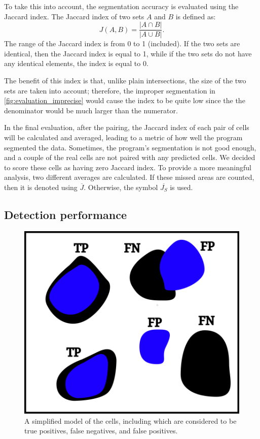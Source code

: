 \documentclass[
  digital,     %
  oneside,     %
  nosansbold,  %
  nocolorbold, %
  lof,         %
  lot,         %
]{fithesis4}
\begin{document}
To take this into account, the segmentation accuracy is evaluated using the
Jaccard index. The Jaccard index of two sets $A$ and $B$ is defined
as\cite{2020eelbode}:
$$J(A, B) = \frac{|A \cap B|}{|A \cup B|}.$$
The range of the Jaccard index is from 0 to 1 (included). If the two sets are
identical, then the Jaccard index is equal to 1, while if the two sets do not
have any identical elements, the index is equal to 0.

The benefit of this index is that, unlike plain intersections, the size of the two
sets are taken into account; therefore, the improper segmentation in
\ref{fig:evaluation_imprecise} would cause the index to be quite low since the
the denominator would be much larger than the numerator.

In the final evaluation, after the pairing, the Jaccard index of each pair of
cells will be calculated and averaged, leading to a metric of how well the
program segmented the data. Sometimes, the program's segmentation is not good enough,
and a couple of the real cells are not paired with any predicted cells. We decided
to score these cells as having zero Jaccard index. To provide a more meaningful analysis,
two different averages are calculated. If these missed areas are counted, then it
is denoted using $\overline{J}$. Otherwise, the symbol $\overline{J_S}$ is used.

\subsection{Detection performance}
\begin{figure}
    \begin{center}
        \includegraphics{resources/inkscape/evaluation_with_TP.png}
    \end{center}
    \caption{A simplified model of the cells, including which are considered to
    be true positives, false negatives, and false positives.}
    \label{fig:evaluation_with_TP}
\end{figure}
\end{document}
